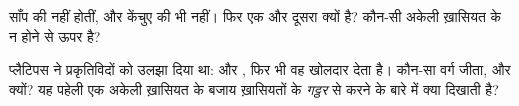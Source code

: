 \begin{exercise}[$\star\star$]\label{exo:g4:classifying-animals:10}
साँप की  नहीं होतीं, और केंचुए की भी नहीं। फिर एक  
और दूसरा  क्यों है? कौन-सी अकेली ख़ासियत  के न होने से
ऊपर है?
\end{exercise}

\begin{exercise}[$\star\star\star$]\label{exo:g4:classifying-animals:11}
प्लैटिपस ने प्रकृतिविदों को उलझा दिया था:  और , फिर भी वह खोलदार
 देता है। कौन-सा वर्ग जीता, और क्यों? यह पहेली एक अकेली ख़ासियत के
बजाय ख़ासियतों के \emph{गट्ठर} से  करने के बारे में क्या दिखाती
है?
\end{exercise}
